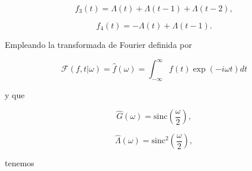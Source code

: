 \documentclass[a4paper,12pt,final]{article}
\begin{document}
      \begin{equation*}
         f_3\left(t\right) = \Lambda\left(t\right) +
                             \Lambda\left(t - 1\right) +
                             \Lambda\left(t - 2\right),
      \end{equation*}

      \begin{equation*}
         f_4\left(t\right) = - \Lambda\left(t\right) +
                               \Lambda\left(t - 1\right).
      \end{equation*}

      \noindent Empleando la transformada de Fourier definida por

      \begin{equation*}
        \mathcal{F}\left(f,t|\omega\right) = \widehat{f}\left(\omega\right) = \int_{-\infty}^{\infty}f\left(t\right)\exp\left(- i \omega t\right)dt
      \end{equation*}

      \noindent y que

      \begin{equation*}
        \widehat{G}\left(\omega\right) = \mathrm{sinc}\left(\frac{\omega}{2}\right),
      \end{equation*}

      \begin{equation*}
        \widehat{\Lambda}\left(\omega\right) = \mathrm{sinc}^{2}\left(\frac{\omega}{2}\right),
      \end{equation*}

      \noindent tenemos
\end{document}
